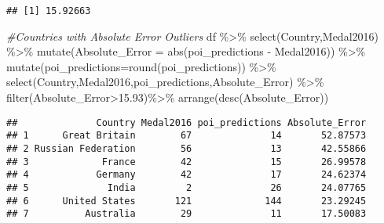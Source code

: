 \documentclass[
]{article}
\newenvironment{Shaded}{\begin{snugshade}}{\end{snugshade}}
\newcommand{\AttributeTok}[1]{\textcolor[rgb]{0.77,0.63,0.00}{#1}}
\newcommand{\CommentTok}[1]{\textcolor[rgb]{0.56,0.35,0.01}{\textit{#1}}}
\newcommand{\FloatTok}[1]{\textcolor[rgb]{0.00,0.00,0.81}{#1}}
\newcommand{\FunctionTok}[1]{\textcolor[rgb]{0.00,0.00,0.00}{#1}}
\newcommand{\NormalTok}[1]{#1}
\newcommand{\SpecialCharTok}[1]{\textcolor[rgb]{0.00,0.00,0.00}{#1}}
\begin{document}
\begin{Shaded}
\end{Shaded}

\begin{verbatim}
## [1] 15.92663
\end{verbatim}

\begin{Shaded}
\begin{Highlighting}[]
\CommentTok{\#Countries with Absolute Error Outliers}
\NormalTok{df }\SpecialCharTok{\%\textgreater{}\%} 
  \FunctionTok{select}\NormalTok{(Country,Medal2016) }\SpecialCharTok{\%\textgreater{}\%}
  \FunctionTok{mutate}\NormalTok{(}\AttributeTok{Absolute\_Error =} \FunctionTok{abs}\NormalTok{(poi\_predictions }\SpecialCharTok{{-}}\NormalTok{ Medal2016)) }\SpecialCharTok{\%\textgreater{}\%}
  \FunctionTok{mutate}\NormalTok{(}\AttributeTok{poi\_predictions=}\FunctionTok{round}\NormalTok{(poi\_predictions)) }\SpecialCharTok{\%\textgreater{}\%}
  \FunctionTok{select}\NormalTok{(Country,Medal2016,poi\_predictions,Absolute\_Error) }\SpecialCharTok{\%\textgreater{}\%}
  \FunctionTok{filter}\NormalTok{(Absolute\_Error}\SpecialCharTok{\textgreater{}}\FloatTok{15.93}\NormalTok{)}\SpecialCharTok{\%\textgreater{}\%}
  \FunctionTok{arrange}\NormalTok{(}\FunctionTok{desc}\NormalTok{(Absolute\_Error))}
\end{Highlighting}
\end{Shaded}

\begin{verbatim}
##              Country Medal2016 poi_predictions Absolute_Error
## 1      Great Britain        67              14       52.87573
## 2 Russian Federation        56              13       42.55866
## 3             France        42              15       26.99578
## 4            Germany        42              17       24.62374
## 5              India         2              26       24.07765
## 6      United States       121             144       23.29245
## 7          Australia        29              11       17.50083
\end{verbatim}
\end{document}
